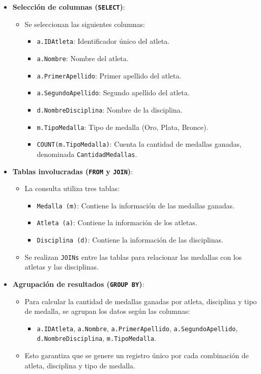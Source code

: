 \begin{itemize}
   \item \textbf{Selección de columnas (\texttt{SELECT})}:
   \begin{itemize}
       \item Se seleccionan las siguientes columnas:
       \begin{itemize}
           \item \texttt{a.IDAtleta}: Identificador único del atleta.
           \item \texttt{a.Nombre}: Nombre del atleta.
           \item \texttt{a.PrimerApellido}: Primer apellido del atleta.
           \item \texttt{a.SegundoApellido}: Segundo apellido del atleta.
           \item \texttt{d.NombreDisciplina}: Nombre de la disciplina.
           \item \texttt{m.TipoMedalla}: Tipo de medalla (Oro, Plata, Bronce).
           \item \texttt{COUNT(m.TipoMedalla)}: Cuenta la cantidad de medallas ganadas, denominada \texttt{CantidadMedallas}.
       \end{itemize}
   \end{itemize}
   
   \item \textbf{Tablas involucradas (\texttt{FROM} y \texttt{JOIN})}:
   \begin{itemize}
       \item La consulta utiliza tres tablas:
       \begin{itemize}
           \item \texttt{Medalla (m)}: Contiene la información de las medallas ganadas.
           \item \texttt{Atleta (a)}: Contiene la información de los atletas.
           \item \texttt{Disciplina (d)}: Contiene la información de las disciplinas.
       \end{itemize}
       \item Se realizan \texttt{JOINs} entre las tablas para relacionar las medallas con los atletas y las disciplinas.
   \end{itemize}
   
   \item \textbf{Agrupación de resultados (\texttt{GROUP BY})}:
   \begin{itemize}
       \item Para calcular la cantidad de medallas ganadas por atleta, disciplina y tipo de medalla, se agrupan los datos según las columnas:
       \begin{itemize}
           \item \texttt{a.IDAtleta}, \texttt{a.Nombre}, \texttt{a.PrimerApellido}, \texttt{a.SegundoApellido}, \texttt{d.NombreDisciplina}, \texttt{m.TipoMedalla}.
       \end{itemize}
       \item Esto garantiza que se genere un registro único por cada combinación de atleta, disciplina y tipo de medalla.
   \end{itemize}
   

\end{itemize}
